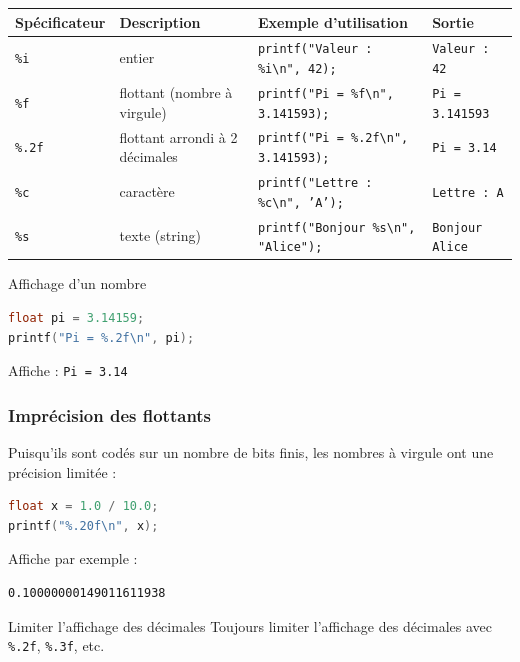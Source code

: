 \begin{center}
	\begin{tabular}{|l|l|l|l|}
		\hline
		Spécificateur  & Description                    & Exemple d'utilisation                                    & Sortie                 \\
		\hline
		\texttt{\%i}   & entier                         & \texttt{printf("Valeur : \%i\textbackslash n", 42);}     & \texttt{Valeur : 42}   \\
		\texttt{\%f}   & flottant (nombre à virgule)    & \texttt{printf("Pi = \%f\textbackslash n", 3.141593);}   & \texttt{Pi = 3.141593} \\
		\texttt{\%.2f} & flottant arrondi à 2 décimales & \texttt{printf("Pi = \%.2f\textbackslash n", 3.141593);} & \texttt{Pi = 3.14}     \\
		\texttt{\%c}   & caractère                      & \texttt{printf("Lettre : \%c\textbackslash n", 'A');}    & \texttt{Lettre : A}    \\
		\texttt{\%s}   & texte (string)                 & \texttt{printf("Bonjour \%s\textbackslash n", "Alice");} & \texttt{Bonjour Alice} \\
		\hline
	\end{tabular}
\end{center}
\begin{UPSTIexemples}{Affichage d'un nombre}
	\begin{lstlisting}[language=c]
float pi = 3.14159;
printf("Pi = %.2f\n", pi);
\end{lstlisting}
	Affiche : \texttt{Pi = 3.14}
\end{UPSTIexemples}


\subsubsection{Imprécision des flottants}
Puisqu'ils sont codés sur un nombre de bits finis, les nombres à virgule ont une précision limitée :

\begin{lstlisting}[language=c]
float x = 1.0 / 10.0;
printf("%.20f\n", x);
\end{lstlisting}

Affiche par exemple :
\begin{lstlisting}[language=bash,style=console]
0.10000000149011611938
\end{lstlisting}

\begin{UPSTIinfor}{Limiter l'affichage des décimales}
	Toujours limiter l’affichage des décimales avec \texttt{\%.2f}, \texttt{\%.3f}, etc.
\end{UPSTIinfor}